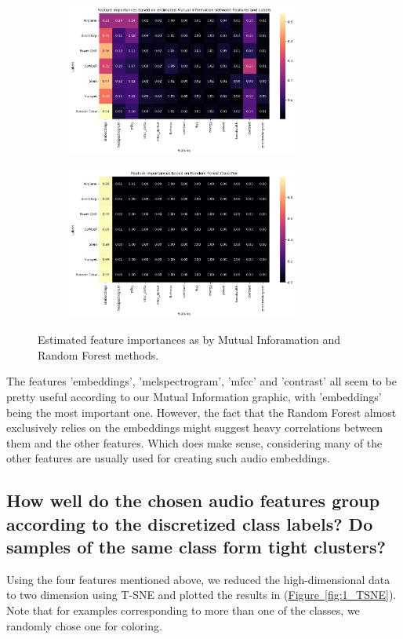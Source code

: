 \begin{figure}[htbp]
  \centering
  \begin{subfigure}[b]{0.49\textwidth}
    \includegraphics[width=\textwidth, height=5cm]{figs/1_MI.png}
  \end{subfigure}
  \hfill
  \begin{subfigure}[b]{0.49\textwidth}
    \includegraphics[width=\textwidth, height=5cm]{figs/1_RF.png}
  \end{subfigure}
  \caption{Estimated feature importances as by Mutual Inforamation and Random Forest methods.}
  \label{fig:1_FI}
\end{figure}

The features 'embeddings', 'melspectrogram', 'mfcc' and 'contrast' all seem to be pretty useful according to our Mutual Information graphic, with 'embeddings' being the most important one. However, the fact that the Random Forest almost exclusively relies on the embeddings might suggest heavy correlations between them and the other features. Which does make sense, considering many of the other features are usually used for creating such audio embeddings.


\subsection{How well do the chosen audio features group according to the discretized class labels? Do samples of the same class form tight clusters?}
\label{sec:Labeling Function:c}
Using the four features mentioned above, we reduced the high-dimensional data to two dimension using T-SNE and plotted the results in (\hyperref[fig:1_TSNE]{Figure~\ref*{fig:1_TSNE}}). Note that for examples corresponding to more than one of the classes, we randomly chose one for coloring.

